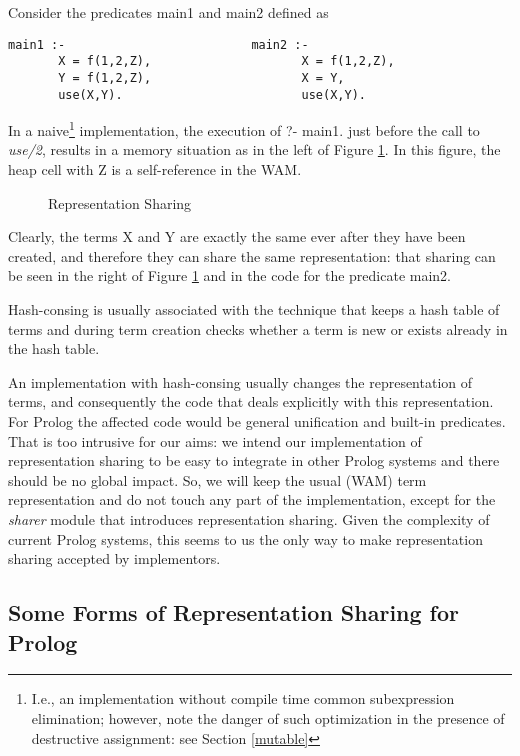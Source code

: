 \documentclass{tlp}
\begin{document}
Consider the predicates main1 and main2 defined as
\begin{Verbatim}[fontsize=\small, frame=single,samepage=true]
main1 :-                          main2 :-
       X = f(1,2,Z),                     X = f(1,2,Z),
       Y = f(1,2,Z),                     X = Y,
       use(X,Y).                         use(X,Y).
\end{Verbatim}
In a naive\footnote{I.e., an implementation without compile time
  common subexpression elimination; however, note the danger of such
  optimization in the presence of destructive assignment: see Section
  \ref{mutable} }
implementation, the execution of ?- main1. just before the call to
{\em use/2}, results in a memory situation as in the left of Figure
\ref{fig1}. In this figure, the heap cell with Z is a self-reference
in the WAM.
\begin{figure}[h]
\begin{centering}
{}
\caption{Representation Sharing}
\label{fig1}
\end{centering}
\end{figure}
Clearly, the terms X and Y are exactly the same ever after they have
been created, and therefore they can share the same representation:
that sharing can be seen in the right of Figure \ref{fig1} and in the
code for the predicate main2.

Hash-consing is usually associated with the technique that keeps a
hash table of terms and during term creation checks whether a term is
new or exists already in the hash table.

An implementation with hash-consing usually changes the representation
of terms, and consequently the code that deals explicitly with this
representation. For Prolog the affected code would be general
unification and built-in predicates. That is too intrusive for our
aims: we intend our implementation of representation sharing to be
easy to integrate in other Prolog systems and there should be no
global impact. So, we will keep the usual (WAM) term representation
and do not touch any part of the implementation, except for the {\em
  sharer} module that introduces representation sharing. Given the
complexity of current Prolog systems, this seems to us the only way to
make representation sharing accepted by implementors.



\subsection*{Some Forms of Representation Sharing for Prolog}\label{somesharinginProlog}
\end{document}
